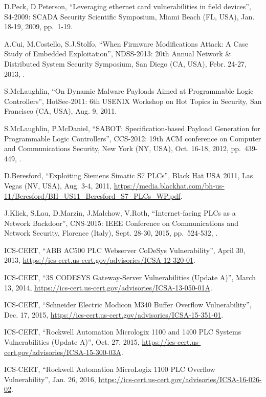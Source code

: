 \begin{thebibliography}{99}
D.Peck, D.Peterson,
``Leveraging ethernet card vulnerabilities in field devices'',
S4-2009: SCADA Security Scientific Symposium,
Miami Beach (FL, USA), Jan. 18-19, 2009,
pp.\ 1-19.

A.Cui, M.Costello, S.J.Stolfo,
``When Firmware Modifications Attack: A Case Study of Embedded Exploitation'',
NDSS-2013: 20th Annual Network \& Distributed System Security Symposium,
San Diego (CA, USA), Febr. 24-27, 2013,
.

S.McLaughlin,
``On Dynamic Malware Payloads Aimed at Programmable Logic Controllers'',
HotSec-2011: 6th USENIX Workshop on Hot Topics in Security,
San Francisco (CA, USA), Aug. 9, 2011.

S.McLaughlin, P.McDaniel,
``SABOT: Specification-based Payload Generation for Programmable Logic Controllers'',
CCS-2012: 19th ACM conference on Computer and Communications Security,
New York (NY, USA), Oct. 16-18, 2012,
pp.\ 439-449,
.

D.Beresford,
``Exploiting Siemens Simatic S7 PLCs'',
Black Hat USA 2011,
Las Vegas (NV, USA), Aug. 3-4, 2011,
\url{https://media.blackhat.com/bh-us-11/Beresford/BH_US11_Beresford_S7_PLCs_WP.pdf}.

J.Klick, S.Lau, D.Marzin, J.Malchow, V.Roth,
``Internet-facing PLCs as a Network Backdoor'',
CNS-2015: IEEE Conference on Communications and Network Security,
Florence (Italy), Sept. 28-30, 2015,
pp.\ 524-532,
.

ICS-CERT,
``ABB AC500 PLC Webserver CoDeSys Vulnerability'',
April 30, 2013,
\url{https://ics-cert.us-cert.gov/advisories/ICSA-12-320-01}.

ICS-CERT,
``3S CODESYS Gateway-Server Vulnerabilities (Update A)'',
March 13, 2014,
\url{https://ics-cert.us-cert.gov/advisories/ICSA-13-050-01A}.

ICS-CERT,
``Schneider Electric Modicon M340 Buffer Overflow Vulnerability'',
Dec. 17, 2015,
\url{https://ics-cert.us-cert.gov/advisories/ICSA-15-351-01}.

ICS-CERT,
``Rockwell Automation Micrologix 1100 and 1400 PLC Systems Vulnerabilities (Update A)'',
Oct. 27, 2015,
\url{https://ics-cert.us-cert.gov/advisories/ICSA-15-300-03A}.

ICS-CERT,
``Rockwell Automation MicroLogix 1100 PLC Overflow Vulnerability'',
Jan. 26, 2016,
\url{https://ics-cert.us-cert.gov/advisories/ICSA-16-026-02}.


\end{thebibliography}
